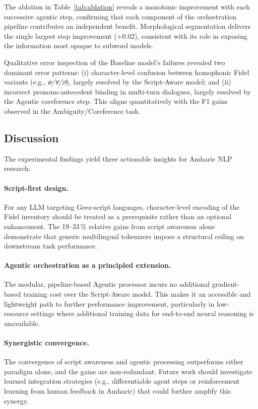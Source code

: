 The ablation in Table~\ref{tab:ablation} reveals a monotonic improvement with each successive
agentic step, confirming that each component of the orchestration pipeline contributes an
independent benefit.  Morphological segmentation delivers the single largest step improvement
(+0.02), consistent with its role in exposing the information most opaque to subword models.

Qualitative error inspection of the Baseline model's failures revealed two dominant error
patterns: (i) character-level confusion between homophonic Fidel variants (e.g.,
\textit{ሀ/ሃ/ኃ}), largely resolved by the Script-Aware model; and (ii) incorrect
pronoun-antecedent binding in multi-turn dialogues, largely resolved by the Agentic coreference
step.  This aligns quantitatively with the F1 gains observed in the Ambiguity/Coreference task.

\subsection{Discussion}
\label{sec:discussion}

The experimental findings yield three actionable insights for Amharic NLP research:

\paragraph{Script-first design.}  For any LLM targeting Ge\textquotesingle ez-script languages,
character-level encoding of the Fidel inventory should be treated as a prerequisite rather than
an optional enhancement.  The 19--33\,\% relative gains from script awareness alone demonstrate
that generic multilingual tokenizers impose a structural ceiling on downstream task performance.

\paragraph{Agentic orchestration as a principled extension.}  The modular, pipeline-based
Agentic processor incurs no additional gradient-based training cost over the Script-Aware model.
This makes it an accessible and lightweight path to further performance improvement, particularly
in low-resource settings where additional training data for end-to-end neural reasoning is
unavailable.

\paragraph{Synergistic convergence.}  The convergence of script awareness and agentic processing
outperforms either paradigm alone, and the gains are non-redundant.  Future work should
investigate learned integration strategies (e.g., differentiable agent steps or reinforcement
learning from human feedback in Amharic) that could further amplify this synergy.
